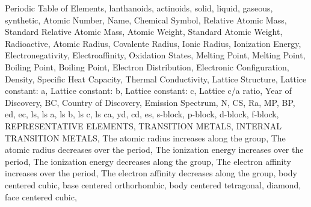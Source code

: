 %
%
%
%
%
Periodic Table of Elements,
lanthanoids,
actinoids,
solid,
liquid,
gaseous,
synthetic,
Atomic Number,
Name,
Chemical Symbol,
Relative Atomic Mass,
Standard Relative Atomic Mass,
Atomic Weight,
Standard Atomic Weight,
Radioactive,
Atomic Radius,
Covalente Radius,
Ionic Radius,
Ionization Energy,
Electronegativity,
Electroaffinity,
Oxidation States,
Melting Point,
Melting Point,
Boiling Point,
Boiling Point,
Electron Distribution,
Electronic Configuration,
Density,
Specific Heat Capacity,
Thermal Conductivity,
Lattice Structure,
Lattice constant: a,
Lattice constant: b,
Lattice constant: c,
Lattice c/a ratio,
Year of Discovery,
BC,
Country of Discovery,
Emission Spectrum,
N,
CS,
Ra,
MP,
BP,
ed,
ec,
ls,
ls a,
ls b,
ls c,
ls ca,
yd,
cd,
es,
s-block,
p-block,
d-block,
f-block,
REPRESENTATIVE ELEMENTS,
TRANSITION METALS,
INTERNAL TRANSITION METALS,
The atomic radius increases along the group,
The atomic radius decreases over the period,
The ionization energy increases over the period,
The ionization energy decreases along the group,
The electron affinity increases over the period,
The electron affinity decreases along the group,
body centered cubic,
base centered orthorhombic,
body centered tetragonal,
diamond,
face centered cubic,
